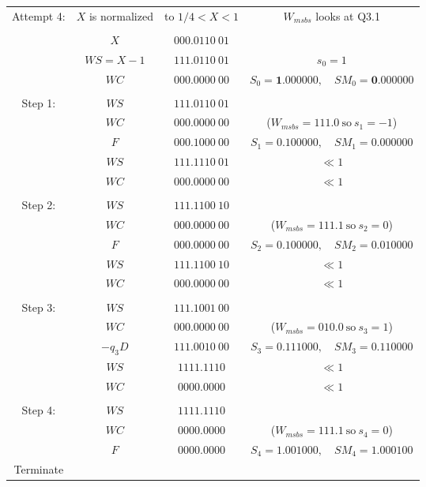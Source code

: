 \documentclass[12pt]{article}
\begin{document}
{\small
\begin{center}
\begin{tabular}{cccc}
    Attempt 4:& $X$ is normalized& to $1/4<X<1$&$W_{msbs}$ looks at Q3.1\\
    &&&\\
            &$X     $&$000.0110\ 01$&\\
            &$WS=X-1$&$111.0110\ 01$& $s_0=1$\\
            &$WC    $&$000.0000\ 00$&$S_0=\mathbf{1}.000000,\quad SM_0=\mathbf{0}.000000$ \\
    \hdashline\\
    Step 1: &$WS    $&$111.0110\ 01$&\\
            &$WC    $&$000.0000\ 00$&($W_{msbs}=111.0\ \text{so}\ s_1=-1$)\\
            &$F     $&$000.1000\ 00$&$S_1=\mathbf{0.1}00000,\quad SM_1=\mathbf{0.0}00000$\\
    \cline{2-3}
            &$WS    $&$111.1110\ 01$&$\ll1$\\
            &$WC    $&$000.0000\ 00$&$\ll1$\\
    \hdashline\\
    Step 2: &$WS    $&$111.1100\ 10$&\\
            &$WC    $&$000.0000\ 00$&($W_{msbs}=111.1\ \text{so}\ s_2=0$)\\
            &$F     $&$000.0000\ 00$&$S_2=\mathbf{0.10}0000,\quad SM_2=\mathbf{0.01}0000$\\
    \cline{2-3}
            &$WS    $&$111.1100\ 10$&$\ll1$\\
            &$WC    $&$000.0000\ 00$&$\ll1$\\
    \hdashline\\
    Step 3: &$WS    $&$111.1001\ 00$&\\
            &$WC    $&$000.0000\ 00$&($W_{msbs}=010.0\ \text{so}\ s_3=1$)\\
            &$-q_3D $&$111.0010\ 00$&$S_3=\mathbf{0.111}000,\quad SM_3=\mathbf{0.110}000$\\
    \cline{2-3}
            &$WS    $&$1111.1110$&$\ll1$\\
            &$WC    $&$0000.0000$&$\ll1$\\
    \hdashline\\
    Step 4: &$WS    $&$1111.1110$&\\
            &$WC    $&$0000.0000$&($W_{msbs}=111.1\ \text{so}\ s_4=0$)\\
            &$F     $&$0000.0000$&$S_4=\mathbf{1.0010}00,\quad SM_4=\mathbf{1.0001}00$\\
    Terminate&&&
\end{tabular}
\end{center}
}
\end{document}
